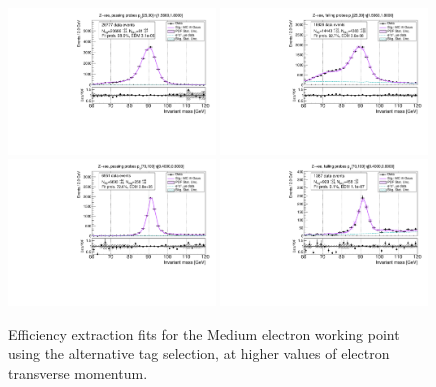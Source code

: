 {\begin{figure}
\centering
\includegraphics[width=0.49\textwidth]{figures/Zee_AltTag_pass_ptBin3_etaBin23.pdf}
\includegraphics[width=0.49\textwidth]{figures/Zee_AltTag_fail_ptBin3_etaBin23.pdf}
\includegraphics[width=0.49\textwidth]{figures/Zee_AltTag_pass_ptBin14_etaBin17.pdf}
\includegraphics[width=0.49\textwidth]{figures/Zee_AltTag_fail_ptBin14_etaBin17.pdf}
\caption{Efficiency extraction fits for the Medium electron working point using the alternative tag selection, at higher values of electron transverse momentum.}
\label{fig:ZeeAltAltTagFits2}
\end{figure}

\clearpage

}
